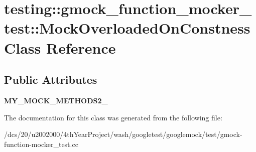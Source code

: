 \hypertarget{classtesting_1_1gmock__function__mocker__test_1_1MockOverloadedOnConstness}{}\section{testing\+:\+:gmock\+\_\+function\+\_\+mocker\+\_\+test\+:\+:Mock\+Overloaded\+On\+Constness Class Reference}
\label{classtesting_1_1gmock__function__mocker__test_1_1MockOverloadedOnConstness}
\subsection*{Public Attributes}
\begin{DoxyCompactItemize}
\item 
\mbox{\label{classtesting_1_1gmock__function__mocker__test_1_1MockOverloadedOnConstness_afb4cd7a26e153426550b9501c7b6c16e}} 
{\bfseries M\+Y\+\_\+\+M\+O\+C\+K\+\_\+\+M\+E\+T\+H\+O\+D\+S2\+\_\+}
\end{DoxyCompactItemize}


The documentation for this class was generated from the following file\+:\begin{DoxyCompactItemize}
\item 
/dcs/20/u2002000/4th\+Year\+Project/wash/googletest/googlemock/test/gmock-\/function-\/mocker\+\_\+test.\+cc\end{DoxyCompactItemize}

